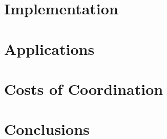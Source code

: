 \documentclass[pldi,blind]{sigplanconf-pldi15}
\begin{document}
\section{Implementation}\label{sec:implementation}


\section{Applications}\label{sec:applications}


\section{Costs of Coordination}


\section{Conclusions}




\end{document}
